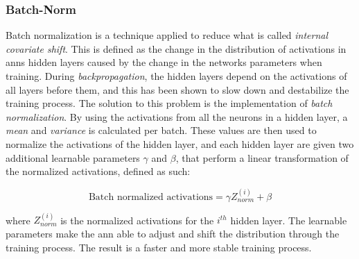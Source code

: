 \subsubsection{Batch-Norm}
    Batch normalization is a technique applied to reduce what is called \textit{internal  covariate shift}\cite{pmlr-v37-ioffe15_batch_norm}. This is defined as the change in the distribution of activations in \gls{ann}s hidden layers caused by the change in the networks parameters when training. During \textit{backpropagation}, the hidden layers depend on the activations of all layers before them, and this has been shown to slow down and destabilize the training process. The solution to this problem is the implementation of \textit{batch normalization}. By using the activations from all the neurons in a hidden layer, a \textit{mean} and \textit{variance} is calculated per batch. These values are then used to normalize the activations of the hidden layer, and each hidden layer are given two additional learnable parameters $\gamma$ and $\beta$, that perform a linear transformation of the normalized activations, defined as such:
    
        \begin{equation} \label{batch_normalization}
            \textrm{Batch normalized activations} =   \gamma Z^{(i)}_{norm} + \beta
        \end{equation}
    
    where $Z^{(i)}_{norm}$ is the normalized activations for the $i^{th}$ hidden layer. The learnable parameters make the \gls{ann} able to adjust and shift the distribution through the training process. The result is a faster and more stable training process. 

